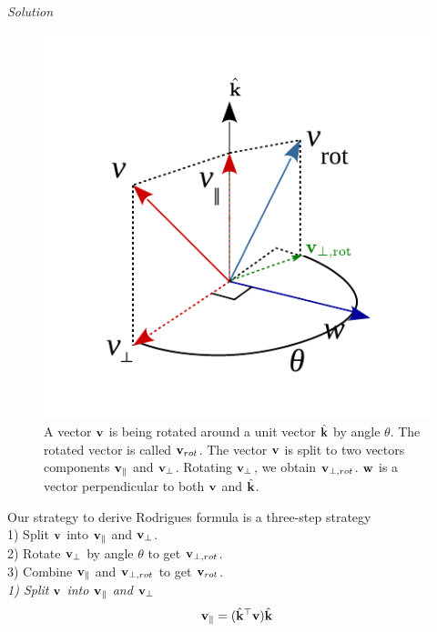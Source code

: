 \documentclass{article}
\numberwithin{prob}{section}
\newenvironment{solution}{\emph{Solution}}{}
\begin{document}
\begin{solution}


\begin{figure}
  \includegraphics[width=\linewidth]{media/Rodrigues-formula.pdf}
  \caption{A vector $\mathbf{v}$ is being rotated around a unit vector $\hat{\mathbf{k}}$ by angle $\theta$. The rotated vector is called $\mathbf{v}_{rot}$. The vector $\mathbf{v}$ is split to two vectors components $\mathbf{v}_{\parallel}$ and $\mathbf{v}_\perp$. 
  Rotating $\mathbf{v}_\perp$, we obtain $\mathbf{v}_{\perp,rot}$. $\mathbf{w}$ is a vector perpendicular to both $\mathbf{v}$ and $\hat{\mathbf{k}}$. }
\end{figure}
Our strategy to derive Rodrigues formula is a three-step strategy\\
  1) Split $\mathbf{v}$ into $\mathbf{v}_\parallel$ and $\mathbf{v}_\perp$.\\
  2) Rotate $\mathbf{v}_\perp$ by angle $\theta$ to get $\mathbf{v}_{\perp,rot}$.\\
  3) Combine $\mathbf{v}_\parallel$ and $\mathbf{v}_{\perp,rot}$ to get $\mathbf{v}_{rot}$.\\

\emph{1) Split $\mathbf{v}$ into $\mathbf{v}_\parallel$ and $\mathbf{v}_\perp$}
\begin{align}
  \mathbf{v}_\parallel = (\hat{\mathbf{k}}^\top  \mathbf{v}) \hat{\mathbf{k}}
\end{align}


\end{solution}
\end{document}
